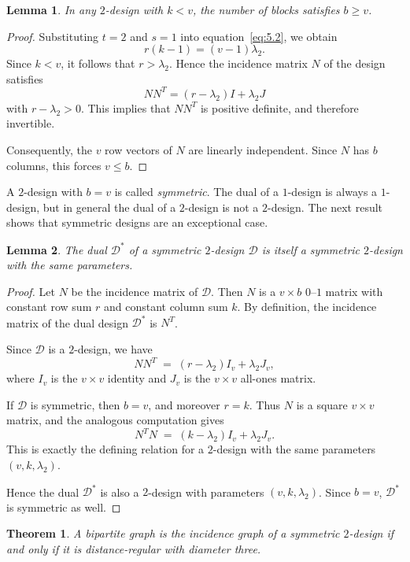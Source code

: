 \documentclass[12pt,a4paper,openany]{book}
\newtheorem{theorem}{Theorem}[section]
\newtheorem{lemma}{Lemma}[section]
\begin{document}
\begin{lemma} \label{lem:5.10.1}
In any $2$-design with $k < v$, the number of blocks satisfies $b \geq v$.
\end{lemma}

\begin{proof}
Substituting $t=2$ and $s=1$ into equation~\eqref{eq:5.2}, we obtain
\[
r(k-1) = (v-1)\lambda_2.
\]
Since $k < v$, it follows that $r > \lambda_2$. Hence the incidence matrix $N$ of the design satisfies
\[
N N^T = (r-\lambda_2)I + \lambda_2 J
\]
with $r-\lambda_2 > 0$. This implies that $N N^T$ is positive definite, and therefore invertible.  

Consequently, the $v$ row vectors of $N$ are linearly independent.  
Since $N$ has $b$ columns, this forces $v \leq b$. 
\end{proof}

A $2$-design with $b=v$ is called \emph{symmetric}.  
The dual of a $1$-design is always a $1$-design, but in general the dual of a $2$-design is not a $2$-design.  
The next result shows that symmetric designs are an exceptional case.

\begin{lemma} \label{lem:5.10.2}
The dual $\mathcal{D}^*$ of a symmetric $2$-design $\mathcal{D}$ is itself a symmetric 
$2$-design with the same parameters.
\end{lemma}

\begin{proof}
Let $N$ be the incidence matrix of $\mathcal{D}$. Then $N$ is a $v \times b$ 
$0$–$1$ matrix with constant row sum $r$ and constant column sum $k$.  
By definition, the incidence matrix of the dual design $\mathcal{D}^*$ is $N^T$.

Since $\mathcal{D}$ is a $2$-design, we have
\[
N N^T \;=\; (r-\lambda_2) I_v + \lambda_2 J_v,
\]
where $I_v$ is the $v \times v$ identity and $J_v$ is the $v \times v$ all-ones matrix.  

If $\mathcal{D}$ is symmetric, then $b = v$, and moreover $r = k$.  
Thus $N$ is a square $v \times v$ matrix, and the analogous computation gives
\[
N^T N \;=\; (k-\lambda_2) I_v + \lambda_2 J_v.
\]
This is exactly the defining relation for a $2$-design with the same parameters 
$(v, k, \lambda_2)$.

Hence the dual $\mathcal{D}^*$ is also a $2$-design with parameters 
$(v, k, \lambda_2)$. Since $b=v$, $\mathcal{D}^*$ is symmetric as well.
\end{proof}

\begin{theorem} \label{thm:5.10.3}
A bipartite graph is the incidence graph of a symmetric $2$-design if and only if it is distance-regular with diameter three.
\end{theorem}
\end{document}
